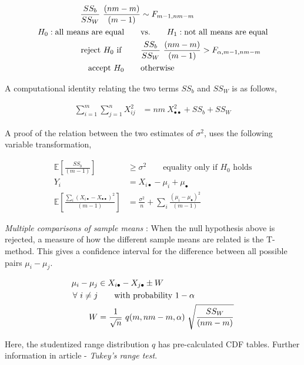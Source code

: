 \begin{align}
	\frac{SS_b}{SS_W}\ \frac{(nm-m)}{(m-1)} &\sim F_{m-1, nm-m} \nonumber \\
	H_0 : \text{all means are equal} \qquad &\text{vs.} \qquad H_1 : \text{not all means are equal} \nonumber \\
	\text{reject $ H_0 $ if } \qquad & \frac{SS_b}{SS_W}\ \frac{(nm-m)}{(m-1)} > F_{\alpha, m-1, nm-m}  \nonumber \\
	\text{accept $ H_0 $} \qquad & \text{otherwise}
\end{align}

A computational identity relating the two terms $ SS_b $ and $ SS_W $ is as follows,

\begin{align}
	\sum\limits_{i = 1}^{m} \sum\limits_{j = 1}^{n} X^2_{ij} &= nm\ X^2_{\bullet \bullet} + SS_b + SS_W
\end{align}

A proof of the relation between the two estimates of $ \sigma^2 $, uses the following variable transformation,

\begin{align}
	\mathbb{E}\left[\frac{SS_b}{(m-1)}\right] &\geq \sigma^2 \qquad \text{equality only if $H_0$ holds} \\
	Y_i &= X_{i\bullet} -\mu_i + \mu_{\bullet} \nonumber \\
	\mathbb{E}\left[\frac{\sum_{i} (X_{i\bullet} - X_{\bullet\bullet})^2}{(m-1)}\right] &= \frac{\sigma^2}{n} + \sum_{i} \frac{(\mu_i - \mu_{\bullet})^2}{(m-1)}
\end{align}

\textit{Multiple comparisons of sample means} : When the null hypothesis above is rejected, a measure of how the different sample means are related is the T-method. This gives a confidence interval for the difference between all possible pairs $ \mu_i - \mu_j $. 

\begin{align}
	\mu_i - \mu_j &\in X_{i\bullet} - X_{j\bullet} \pm W \\
	\forall \ i\neq j &\qquad \text{with probability $ 1-\alpha $} \nonumber \\
	W &= \frac{1}{\sqrt{n}} \ q(m, nm-m, \alpha)\ \sqrt{\frac{SS_W}{(nm-m)}}
\end{align}

Here, the studentized range distribution $ q $ has pre-calculated CDF tables. Further information in article - \textit{Tukey's range test}.

